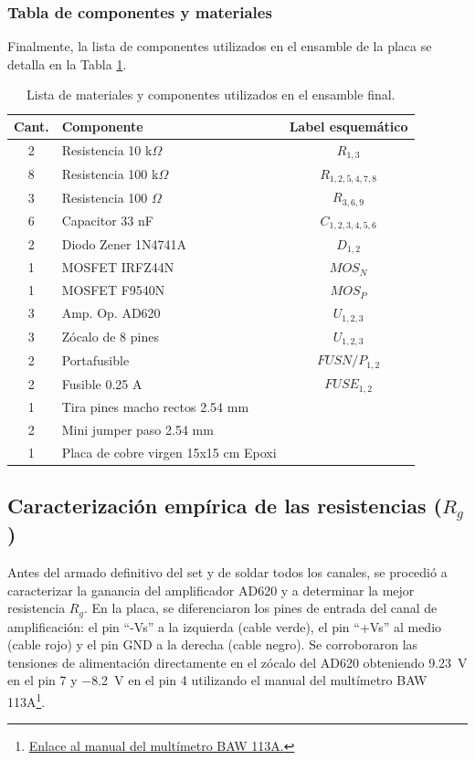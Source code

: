 \subsubsection{Tabla de componentes y materiales}

Finalmente, la lista de componentes utilizados en el ensamble de la placa se detalla en la Tabla \ref{tab: componentes electronicos}.

\begin{table}[htbp]
    \centering
    \caption{\label{tab: componentes electronicos}Lista de materiales y componentes utilizados en el ensamble final.}
    \begin{tabularx}{\linewidth}{c X c} 
        \toprule
        \textbf{Cant.} & \textbf{Componente} & \textbf{Label esquemático} \\
        \midrule
        2 & Resistencia 10 k$\Omega$ & $R_{1,3}$\\
        8 & Resistencia 100 k$\Omega$ & $R_{1,2,5,4,7,8}$\\
        3 & Resistencia 100 $\Omega$ & $R_{3,6,9}$\\
        6 & Capacitor 33 nF & $C_{1,2,3,4,5,6}$\\
        2 & Diodo Zener 1N4741A & $D_{1,2}$\\
        1 & MOSFET IRFZ44N & $MOS_N$\\
        1 & MOSFET F9540N & $MOS_P$\\
        3 & Amp. Op. AD620 & $U_{1,2,3}$\\
        3 & Zócalo de 8 pines & $U_{1,2,3}$\\
        2 & Portafusible & $FUSN/P_{1,2}$\\
        2 & Fusible 0.25 A & $FUSE_{1,2}$\\
        1 & Tira pines macho rectos 2.54 mm & \\
        2 & Mini jumper paso 2.54 mm & \\
        1 & Placa de cobre virgen 15x15 cm Epoxi & \\
        \bottomrule
    \end{tabularx}
\end{table}

\subsection{Caracterización empírica de las resistencias ($R_g$)}

Antes del armado definitivo del set y de soldar todos los canales, se procedió a caracterizar la ganancia del amplificador AD620 y a determinar la mejor resistencia $R_g$. En la placa, se diferenciaron los pines de entrada del canal de amplificación: el pin \enquote{-Vs} a la izquierda (cable verde), el pin \enquote{+Vs} al medio (cable rojo) y el pin GND a la derecha (cable negro). Se corroboraron las tensiones de alimentación directamente en el zócalo del AD620 obteniendo \qty{+9.23}{\volt} en el pin 7 y \qty{-8.2}{\volt} en el pin 4 utilizando el manual del multímetro BAW 113A\footnote{\href{https://drive.google.com/file/d/1Ys8rz5UgeEuBFSSgIJXgsLeXh0dEUI4q/view}{Enlace al manual del multímetro BAW 113A.}}.

